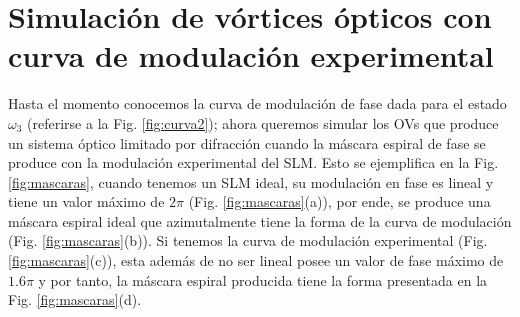 \section{Simulación de vórtices ópticos con curva de modulación experimental}
\label{sec:sim_vor_mod_exp}


Hasta el momento conocemos la curva de modulación de fase dada para el estado $\omega_3$ (referirse a la Fig. \ref{fig:curva2}); ahora queremos simular los OVs que produce un sistema óptico limitado por difracción cuando la máscara espiral de fase se produce con la modulación experimental del SLM. Esto se ejemplifica en la Fig. \ref{fig:mascaras}, cuando tenemos un SLM ideal, su modulación en fase es lineal y tiene un valor máximo de $2\pi$ (Fig. \ref{fig:mascaras}(a)), por ende, se produce una máscara espiral ideal que azimutalmente tiene la forma de la curva de modulación (Fig. \ref{fig:mascaras}(b)). Si tenemos la curva de modulación experimental (Fig. \ref{fig:mascaras}(c)), esta además de no ser lineal posee un valor de fase máximo de $1.6\pi$ y por tanto, la máscara espiral producida tiene la forma presentada en la Fig. \ref{fig:mascaras}(d). 

